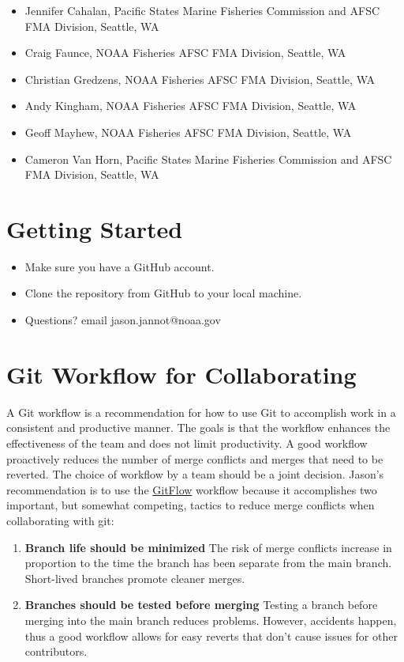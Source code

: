 \documentclass[
  letterpaper,
  DIV=11,
  numbers=noendperiod]{scrreprt}
\providecommand{\tightlist}{%
  \setlength{\itemsep}{0pt}\setlength{\parskip}{0pt}}\usepackage{longtable,booktabs,array}
\begin{document}
\begin{itemize}
\item
  Jennifer Cahalan, Pacific States Marine Fisheries Commission and AFSC
  FMA Division, Seattle, WA
\item
  Craig Faunce, NOAA Fisheries AFSC FMA Division, Seattle, WA
\item
  Christian Gredzens, NOAA Fisheries AFSC FMA Division, Seattle, WA
\item
  Andy Kingham, NOAA Fisheries AFSC FMA Division, Seattle, WA
\item
  Geoff Mayhew, NOAA Fisheries AFSC FMA Division, Seattle, WA
\item
  Cameron Van Horn, Pacific States Marine Fisheries Commission and AFSC
  FMA Division, Seattle, WA
\end{itemize}

\section{Getting Started}\label{getting-started}

\begin{itemize}
\tightlist
\item
  Make sure you have a GitHub account.
\item
  Clone the repository from GitHub to your local machine.
\item
  Questions? email jason.jannot@noaa.gov
\end{itemize}

\section{Git Workflow for
Collaborating}\label{git-workflow-for-collaborating}

A Git workflow is a recommendation for how to use Git to accomplish work
in a consistent and productive manner. The goals is that the workflow
enhances the effectiveness of the team and does not limit productivity.
A good workflow proactively reduces the number of merge conflicts and
merges that need to be reverted. The choice of workflow by a team should
be a joint decision. Jason's recommendation is to use the
\href{https://www.atlassian.com/git/tutorials/comparing-workflows/gitflow-workflow}{GitFlow}
workflow because it accomplishes two important, but somewhat competing,
tactics to reduce merge conflicts when collaborating with git:

\begin{enumerate}
\def\labelenumi{\arabic{enumi}.}
\item
  \textbf{Branch life should be minimized} The risk of merge conflicts
  increase in proportion to the time the branch has been separate from
  the main branch. Short-lived branches promote cleaner merges.
\item
  \textbf{Branches should be tested before merging} Testing a branch
  before merging into the main branch reduces problems. However,
  accidents happen, thus a good workflow allows for easy reverts that
  don't cause issues for other contributors.
\end{enumerate}
\end{document}
